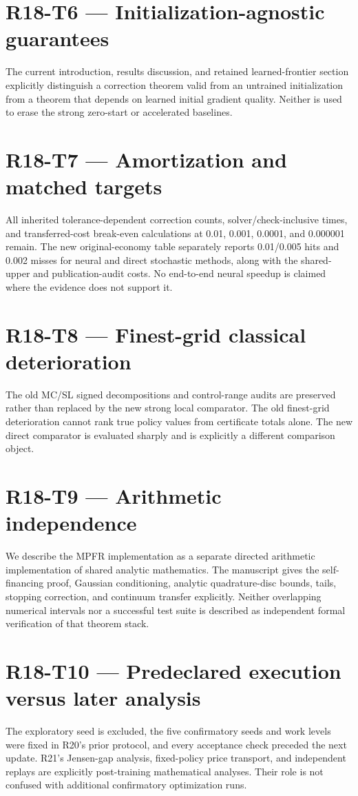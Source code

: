 \documentclass[ecta]{econsocart}
\theoremstyle{remark}
\begin{document}
\section{R18-T6 — Initialization-agnostic guarantees}
The current introduction, results discussion, and retained learned-frontier section explicitly distinguish a correction theorem valid from an untrained initialization from a theorem that depends on learned initial gradient quality. Neither is used to erase the strong zero-start or accelerated baselines.

\section{R18-T7 — Amortization and matched targets}
All inherited tolerance-dependent correction counts, solver/check-inclusive times, and transferred-cost break-even calculations at 0.01, 0.001, 0.0001, and 0.000001 remain. The new original-economy table separately reports 0.01/0.005 hits and 0.002 misses for neural and direct stochastic methods, along with the shared-upper and publication-audit costs. No end-to-end neural speedup is claimed where the evidence does not support it.

\section{R18-T8 — Finest-grid classical deterioration}
The old MC/SL signed decompositions and control-range audits are preserved rather than replaced by the new strong local comparator. The old finest-grid deterioration cannot rank true policy values from certificate totals alone. The new direct comparator is evaluated sharply and is explicitly a different comparison object.

\section{R18-T9 — Arithmetic independence}
We describe the MPFR implementation as a separate directed arithmetic implementation of shared analytic mathematics. The manuscript gives the self-financing proof, Gaussian conditioning, analytic quadrature-disc bounds, tails, stopping correction, and continuum transfer explicitly. Neither overlapping numerical intervals nor a successful test suite is described as independent formal verification of that theorem stack.

\section{R18-T10 — Predeclared execution versus later analysis}
The exploratory seed is excluded, the five confirmatory seeds and work levels were fixed in R20's prior protocol, and every acceptance check preceded the next update. R21's Jensen-gap analysis, fixed-policy price transport, and independent replays are explicitly post-training mathematical analyses. Their role is not confused with additional confirmatory optimization runs.
\end{document}
